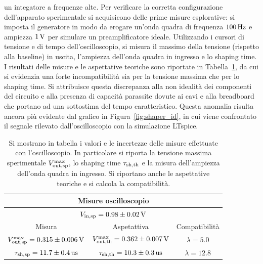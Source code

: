 un integatore a frequenze alte.
Per verificare la corretta configurazione dell'apparato sperimentale si acquisicono
delle prime misure esplorative: si imposta il generatore in modo da erogare un'onda quadra
di frequenza $100\Hz$ e ampiezza $1\,\si{\volt}$ per simulare un preamplificatore ideale. Utilizzando
i cursori di tensione e di tempo dell'oscilloscopio, si misura il massimo della tensione (rispetto alla baseline) in uscita, l'ampiezza dell'onda quadra in ingresso e lo shaping time.
I risultati delle misure e le aspettative teoriche sono riportate in Tabella~\ref{tab:shaper_misure_osc}, da cui si evidenzia una forte incompatibilità sia per
la tensione massima che per lo shaping time. Si attribuisce questa discrepanza alla non idealità dei componenti del circuito e alla presenza di capacità parassite dovute ai cavi e alla breadboard che portano ad una sottostima del tempo caratteristico. Questa anomalia risulta ancora più
evidente dal grafico in Figura~\ref{fig:shaper_id}, in cui viene confrontato il segnale rilevato
dall'oscilloscopio con la simulazione LTspice.

\begin{table}[h]
\centering
\setlength{\tabcolsep}{10pt}
\begin{tabular}{ |c|c|c|  }
\hline
\multicolumn{3}{|c|}{Misure oscilloscopio} \\
\hline
\multicolumn{3}{|c|}{$V_{\text{in},\text{sp}}= 0.98 \pm 0.02\,\si{\volt}$} \\
\hline
Misura      & Aspetattiva & Compatibilità\\
$V_{\text{out},\text{sp}}^{\text{max}}= 0.315\pm 0.006\,\si{\volt}$    & $V_{\text{out},\text{th}}^{\text{max}}= 0.362\pm 0.007\,\si{\volt}$  & $\lambda=5.0$\\
$\tau_{\sh,\text{sp}}= 11.7 \pm 0.4\us$  & $\tau_{\sh,\text{th}}= 10.3\pm 0.3\us$ & $\lambda=12.8$\\
\hline
\end{tabular}
\caption{\footnotesize{Si mostrano in tabella i valori e le incertezze delle misure effettuate con l'oscilloscopio. In particolare si riporta la tensione massima sperimentale $V_{\text{out},\text{sp}}^{\text{max}}$, lo shaping time $\tau_{\text{sh},\text{th}}$ e la misura dell'ampiezza
  dell'onda quadra in ingresso. Si riportano anche le aspettative teoriche e si calcola la compatibilità.}}\label{tab:shaper_misure_osc}
\end{table}



